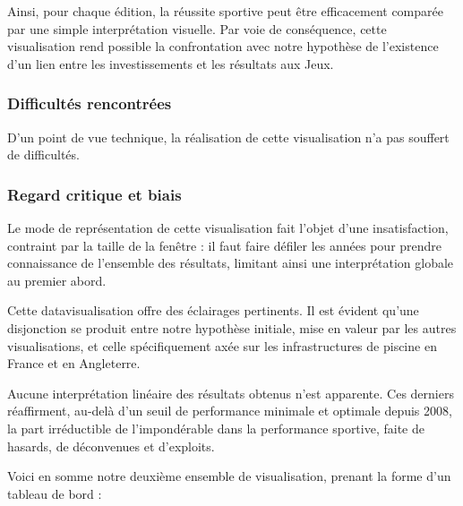 \documentclass[hidelinks, 12pt]{report}
\begin{document}
Ainsi, pour chaque édition, la réussite sportive peut être efficacement comparée par une simple interprétation visuelle. Par voie de conséquence, cette visualisation rend possible la confrontation avec notre hypothèse de l'existence d'un lien entre les investissements et les résultats aux Jeux.

\subsubsection{Difficultés rencontrées}

D’un point de vue technique, la réalisation de cette visualisation n’a pas souffert de difficultés.

\subsubsection{Regard critique et biais}

Le mode de représentation de cette visualisation fait l'objet d'une insatisfaction, contraint par la taille de la fenêtre : il faut faire défiler les années pour prendre connaissance de l'ensemble des résultats, limitant ainsi une interprétation globale au premier abord.

Cette datavisualisation offre des éclairages pertinents. Il est évident qu'une disjonction se produit entre notre hypothèse initiale, mise en valeur par les autres visualisations, et celle spécifiquement axée sur les infrastructures de piscine en France et en Angleterre.

Aucune interprétation linéaire des résultats obtenus n'est apparente. Ces derniers réaffirment, au-delà d'un seuil de performance minimale et optimale depuis 2008, la part irréductible de l'impondérable dans la performance sportive, faite de hasards, de déconvenues et d'exploits.

Voici en somme notre deuxième ensemble de visualisation, prenant la forme d'un tableau de bord :
\end{document}
